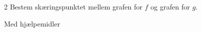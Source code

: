 \begin{delopgave}{}{2}
	Bestem skæringspunktet mellem grafen for $f$ og grafen for $g$. 
\end{delopgave}
\newpage

\begin{center}
	\LARGE Med hjælpemidler
\end{center}


